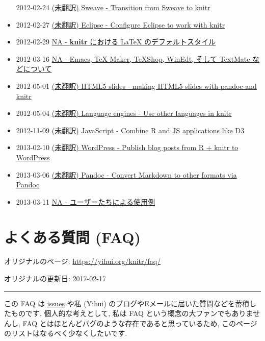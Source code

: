 \documentclass[
  lualatex,ja=standard,jafont=noto-otf]{bxjsreport}
\begin{document}
\begin{itemize}
  2012-02-24 \href{https://yihui.org/knitr/demo/sweave}{(未翻訳) Sweave
  - Transition from Sweave to knitr}
\item
  2012-02-27 \href{https://yihui.org/knitr/demo/eclipse}{(未翻訳)
  Eclipse - Configure Eclipse to work with knitr}
\item
  2012-02-29 \href{NA}{NA - \textbf{knitr} における LaTeX
  のデフォルトスタイル}
\item
  2012-03-16 \href{NA}{NA - Emacs, TeX Maker, TeXShop, WinEdt, そして
  TextMate などについて}
\item
  2012-05-01 \href{https://yihui.org/knitr/demo/slides}{(未翻訳) HTML5
  slides - making HTML5 slides with pandoc and knitr}
\item
  2012-05-04 \href{https://yihui.org/knitr/demo/engines}{(未翻訳)
  Language engines - Use other languages in knitr}
\item
  2012-11-09 \href{https://yihui.org/knitr/demo/javascript}{(未翻訳)
  JavaScript - Combine R and JS applications like D3}
\item
  2013-02-10 \href{https://yihui.org/knitr/demo/wordpress}{(未翻訳)
  WordPress - Publish blog posts from R + knitr to WordPress}
\item
  2013-03-06 \href{https://yihui.org/knitr/demo/pandoc}{(未翻訳) Pandoc
  - Convert Markdown to other formats via Pandoc}
\item
  2013-03-11 \href{NA}{NA - ユーザーたちによる使用例}
\end{itemize}

\hypertarget{FAQs}{%
\chapter{よくある質問 (FAQ)}\label{FAQs}}

オリジナルのページ: \url{https://yihui.org/knitr/faq/}

オリジナルの更新日: 2017-02-17

\begin{center}\rule{0.5\linewidth}{0.5pt}\end{center}

この FAQ は \href{https://github.com/yihui/knitr/issues}{issues} や私
(Yihui) のブログやEメールに届いた質問などを蓄積したものです.
個人的な考えとして, 私は FAQ という概念の大ファンでもありませんし, FAQ
とはほとんどバグのような存在であると思っているため,
このページのリストはなるべく少なくしたいです.
\end{document}
